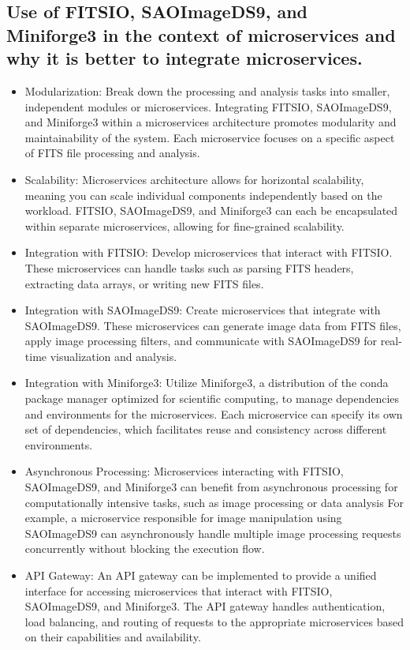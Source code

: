 \documentclass[a4paper,oneside,11pt]{book}
\begin{document}
\subsection{Use of FITSIO, SAOImageDS9, and Miniforge3 in the context of microservices and why it is better to integrate microservices.}
\begin{itemize}
    \item Modularization: Break down the processing and analysis tasks into smaller, independent modules or microservices. Integrating FITSIO, SAOImageDS9, and Miniforge3 within a microservices architecture promotes modularity and maintainability of the system. Each microservice focuses on a specific aspect of FITS file processing and analysis. 
    \item Scalability: Microservices architecture allows for horizontal scalability, meaning you can scale individual components independently based on the workload. FITSIO, SAOImageDS9, and Miniforge3 can each be encapsulated within separate microservices, allowing for fine-grained scalability.
    \item Integration with FITSIO: Develop microservices that interact with FITSIO. These microservices can handle tasks such as parsing FITS headers, extracting data arrays, or writing new FITS files.
    \item Integration with SAOImageDS9: Create microservices that integrate with SAOImageDS9. These microservices can generate image data from FITS files, apply image processing filters, and communicate with SAOImageDS9 for real-time visualization and analysis.
    \item Integration with Miniforge3: Utilize Miniforge3, a distribution of the conda package manager optimized for scientific computing, to manage dependencies and environments for the microservices. Each microservice can specify its own set of dependencies, which facilitates reuse and consistency across different environments.
    \item Asynchronous Processing: Microservices interacting with FITSIO, SAOImageDS9, and Miniforge3 can benefit from asynchronous processing for computationally intensive tasks, such as image processing or data analysis For example, a microservice responsible for image manipulation using SAOImageDS9 can asynchronously handle multiple image processing requests concurrently without blocking the execution flow. 
    \item API Gateway: An API gateway can be implemented to provide a unified interface for accessing microservices that interact with FITSIO, SAOImageDS9, and Miniforge3. The API gateway handles authentication, load balancing, and routing of requests to the appropriate microservices based on their capabilities and availability.
\end{itemize}
\end{document}
